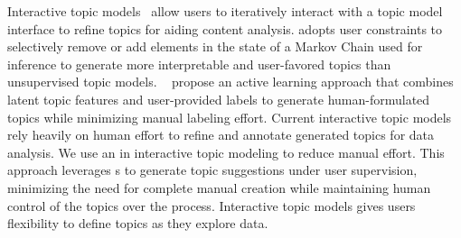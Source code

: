 
Interactive topic models~\cite{Hu:Boyd-Graber:Satinoff-2011, ITM-1} allow users to iteratively interact with a topic model interface to refine topics for aiding content analysis.
%
\citet{Hu:Boyd-Graber:Satinoff-2011} adopts user constraints to selectively remove or add elements in the state of a Markov Chain used for inference to generate more interpretable and user-favored topics than unsupervised topic models. 
%
~\citet{alto, li-etal-2024-improving} propose an active learning approach that combines latent topic features and user-provided labels to generate human-formulated topics while minimizing manual labeling effort.
% 
Current interactive topic models rely heavily on human effort to refine and annotate generated topics for data analysis. 
%
We use an \mm{} in interactive topic modeling to reduce manual effort. 
%
This approach leverages \mm{}s to generate topic suggestions under user supervision, minimizing the need for complete manual creation while maintaining human control of the topics over the process.
%
Interactive topic models gives users flexibility to define topics as they explore data.
%